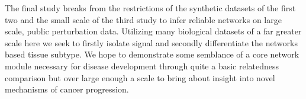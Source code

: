 \begin{abstracts}
The final study breaks from the restrictions of the synthetic datasets of the first two and the small scale of the third study to infer reliable networks on large scale, public perturbation data. Utilizing many biological datasets of a far greater scale here we seek to firstly isolate signal and secondly differentiate the networks based tissue subtype. We hope to demonstrate some semblance of a core network module necessary for disease development through quite a basic relatedness comparison but over large enough a scale to bring about insight into novel mechanisms of cancer progression.


\end{abstracts}

